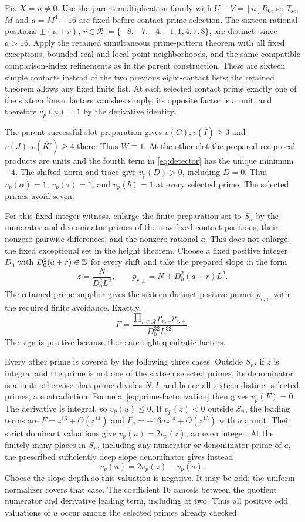 \documentclass[11pt,a4paper]{article}
\begin{document}
Fix $X=n\ne0$. Use the parent multiplication family with
$U-V=[n]R_0$, so $T_{\mathrm{sc}}$, $M$ and $a=M^4+16$ are fixed
before contact prime selection. The sixteen rational positions
$\pm(a+r)$, $r\in\mathcal R:=\{-8,-7,-4,-1,1,4,7,8\}$,
are distinct, since $a>16$. Apply the retained simultaneous
prime-pattern theorem with all fixed exceptions, bounded real and local
point neighborhoods, and the same compatible comparison-index refinements
as in the parent construction. These are sixteen simple contacts instead
of the two previous eight-contact lists; the retained theorem allows any
fixed finite list. At each selected contact prime exactly one of the
sixteen linear factors vanishes simply, its opposite factor is a unit,
and therefore $v_p(u)=1$ by the derivative identity.

The parent successful-slot preparation gives $v(C),v(\overline I)\ge3$
and $v(J),v(\overline{K'})\ge4$ there. Thus $W\equiv1$. At the other
slot the prepared reciprocal products are units and the fourth term in
\eqref{eq:detector} has the unique minimum $-4$. The shifted norm and
trace give $v_p(D)>0$, including $D=0$. Thus $v_p(\alpha)=1$,
$v_p(\tau)=1$, and $v_p(b)=1$ at every selected prime. The selected
primes avoid seven.

For this fixed integer witness, enlarge the finite preparation set to
$S_n$ by the numerator and denominator primes of the now-fixed contact
positions, their nonzero pairwise differences, and the nonzero rational
$a$. This does not
enlarge the fixed exceptional set in the height theorem. Choose a fixed
positive integer $D_0$ with $D_0^2(a+r)\in\mathbb Z$ for every shift and take
the prepared slope in the form
\[
 z=\frac{N}{D_0^2L^2},\qquad
 p_{r,\pm}=N\pm D_0^2(a+r)L^2.
\]
The retained prime supplier gives the sixteen distinct positive primes
$p_{r,\pm}$ with the required finite avoidance. Exactly,
\begin{equation}\label{eq:prime-factorization}
 F=\frac{\prod_{r\in\mathcal R}p_{r,-}p_{r,+}}
                {D_0^{32}L^{32}}.
\end{equation}
The sign is positive because there are eight quadratic factors.

Every other prime is covered by the following three cases. Outside
$S_n$, if $z$ is integral and the prime is not one of the sixteen selected
primes, its denominator is a unit: otherwise that prime divides $N,L$
and hence all sixteen distinct selected primes, a contradiction.
Formula~\eqref{eq:prime-factorization} then gives $v_p(F)=0$.
The derivative is integral, so $v_p(u)\le0$. If $v_p(z)<0$ outside
$S_n$, the leading terms are $F=z^{16}+O(z^{14})$ and
$F_a=-16az^{14}+O(z^{12})$ with $a$ a unit. Their strict dominant
valuations give $v_p(u)=2v_p(z)$, an even integer. At the finitely many
places in $S_n$, including any numerator or denominator prime of $a$,
the prescribed sufficiently deep slope denominator gives instead
\[
                      v_p(u)=2v_p(z)-v_p(a).
\]
Choose the slope depth so this valuation is negative. It may be odd;
the uniform normalizer covers that case. The coefficient 16 cancels
between the quotient numerator and derivative leading term, including
at two. Thus all positive odd valuations of $u$ occur among the selected
primes already checked.
\end{document}
